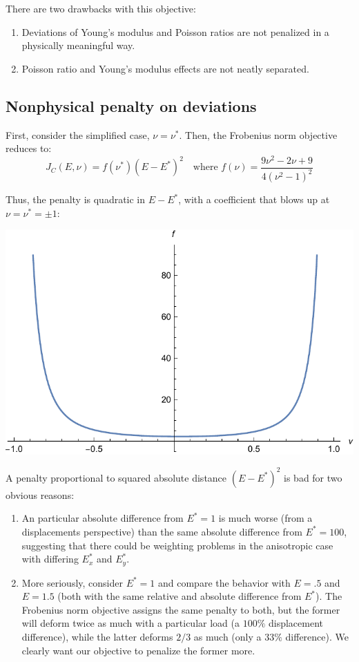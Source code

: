 \documentclass[10pt]{article}
\begin{document}
There are two drawbacks with this objective:

\begin{enumerate}
\item Deviations of Young's modulus and Poisson ratios are not penalized in a
      physically meaningful way.
\item Poisson ratio and Young's modulus effects are not neatly separated.
\end{enumerate}

\subsection{Nonphysical penalty on deviations}
First, consider the simplified case, $\nu = \nu^*$. Then, the Frobenius
norm objective reduces to:
$$
J_C(E, \nu) = f(\nu^*) (E - E^*)^2 \quad \text{where } f(\nu) = \frac{9 {\nu} ^2-2 {\nu} +9}{4 \left({\nu} ^2-1\right)^2}
$$

Thus, the penalty is quadratic in $E - E^*$, with a coefficient that blows up at $\nu = \nu^* = \pm 1$:
\\
\begin{minipage}{\linewidth}
    \centering
    \includegraphics[width=.5\textwidth]{quadraticCoefficient.pdf}
\end{minipage}

A penalty proportional to squared absolute distance $(E - E^*)^2$ is bad for
two obvious reasons:

\begin{enumerate}
    \item An particular absolute difference from $E^* = 1$ is much worse (from a
        displacements perspective) than the same absolute difference from $E^* =
        100$, suggesting that there could be weighting problems in the
        anisotropic case with differing $E_x^*$ and $E_y^*$. 
\item More seriously, consider $E^* = 1$ and compare the behavior with $E = .5$
    and $E = 1.5$ (both with the same relative and absolute difference from
    $E^*$). The Frobenius norm objective assigns the same penalty to both, but
    the former will deform twice as much with a particular load (a $100\%$
    displacement difference), while the latter deforms $2/3$ as much (only a $33\%$
    difference). We clearly want our objective to penalize the former more.
\end{enumerate}
\end{document}
